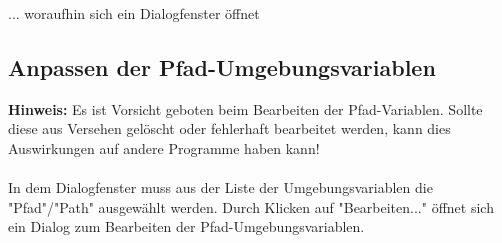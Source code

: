\documentclass[ngerman,oneside, a4letter]{article}
\begin{document}
\begin{center}
\end{center}

\clearpage
\noindent... woraufhin sich ein Dialogfenster öffnet

\begin{center}
\end{center}

\clearpage


\subsection{Anpassen der Pfad-Umgebungsvariablen}

\textbf{Hinweis:} Es ist Vorsicht geboten beim Bearbeiten der Pfad-Variablen. Sollte diese aus Versehen gelöscht oder fehlerhaft bearbeitet werden, kann dies Auswirkungen auf andere Programme haben kann!
\\
\\
In dem Dialogfenster muss aus der Liste der Umgebungsvariablen die "Pfad"/"Path" ausgewählt werden.
Durch Klicken auf "Bearbeiten..." öffnet sich ein Dialog zum Bearbeiten der Pfad-Umgebungsvariablen.
\end{document}

